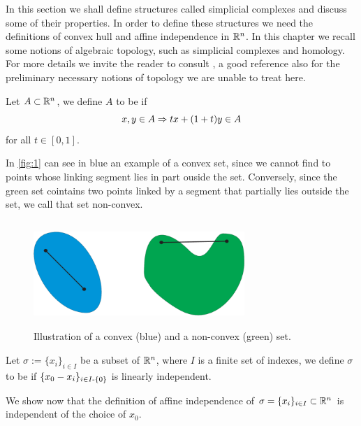 \documentclass[../1.tex]{subfiles}
\begin{document}
    In this section we shall define structures called simplicial complexes and discuss some of their properties. In order to define these structures
    we need the definitions of convex hull and affine independence in $\mathbb{R}^n$. In this chapter we recall some notions of algebraic topology, such as simplicial
    complexes and homology. For more details we invite the reader to consult \cite{hatcher}, a good reference also for the preliminary necessary notions of
    topology we are unable to treat here.    

    \begin{defn}
        Let $A \subset \mathbb{R}^n$, we define $A$ to be  if
        \[ x,y \in A \Rightarrow tx + (1+t)y \in A \]
        for all $t \in [0,1]$.
    \end{defn}

    In \autoref{fig:1} can see in blue an example of a convex set, since we cannot find to points whose linking segment lies in part ouside the set.
    Conversely, since the green set cointains two points linked by a segment that partially lies outside the set, we call that set non-convex.

    \begin{figure}[H]
        \centering
        \includegraphics[width=8cm, height=4cm]{sections/1/convex}
        \caption{Illustration of a convex (blue) and a non-convex (green) set.}
        \label{fig:1}
    \end{figure}

    \begin{defn}
        Let $\sigma := \{x_i\}_{i \in I}$ be a subset of $\mathbb{R}^n$, where $I$ is a finite set of indexes, we define $\sigma$ to be  if 
        $\{ x_0 - x_i\}_{i \in I \text{-} \{0\}}$ is linearly independent.
    \end{defn}

    We show now that the definition of affine independence of $\sigma = \{x_i\}_{i \in I} \subset \mathbb{R}^n$ is independent of the choice of $x_0$.
      
\end{document}
